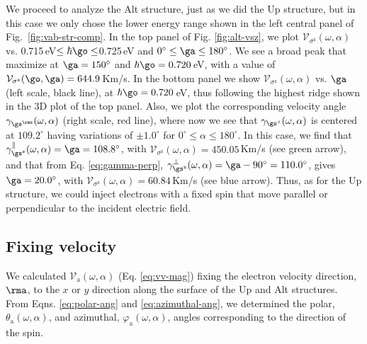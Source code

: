 \documentclass[floatfix,prb,aps,superscriptaddress,showpacs,11pt,preprint,letterpaper]{revtex4}
\begin{document}
We proceed to analyze the Alt structure, just as we did the Up structure, but
in this case we only chose the lower energy range shown in the left central
panel of Fig.~\ref{fig:vab-str-comp}. 
% 
In the top panel of Fig. \ref{fig:alt-vsz}, we plot
$\mathcal{V}_{\sigma^{\mathrm{z}}} (\omega,\alpha)$ vs.
0.715\,eV$\leq\hbar\go\leq$0.725\,eV and $0^\circ\leq\ga\leq 180^\circ$. We
see a broad peak that maximize at $\ga=150^{\circ}$ and $\hbar\go=
0.720$\,eV, with a value of $\mathcal{V}_{\sigma^{\mathrm{z}}}(\go,\ga) =
644.9$\,Km/s.
% 
In the bottom panel we  show $\mathcal{V}_{\sigma^{\mathrm{z}}}
(\omega,\alpha)$ vs. $\ga$ (left scale, black line), at $\hbar\go= 0.720$\,eV,
 thus following the highest ridge shown in the 3D plot of the top
panel. Also, we plot the corresponding velocity angle $\gamma_{\gs^\rmz}
(\omega,\alpha)$ (right scale, red line), where now we see that
$\gamma_{\gs^z}(\omega,\alpha)$ is centered at $109.2^{\circ}$ having
variations of $\pm 1.0^{\circ}$ for $0^{\circ} \leq
\alpha \leq 180^{\circ}$.
% 
In this case, we find that $\gamma^\parallel_{\gs^\mathrm{z}} (\omega,\alpha) =
\ga = 108.8^\circ$, with $\mathcal{V}_{\sigma^{\mathrm{z}}} (\omega,\alpha) =
450.05$\,Km/s (see green arrow), and that from Eq. \eqref{eq:gamma-perp},
$\gamma^\perp_{\gs^\mathrm{z}}(\omega,\alpha)=\ga-90^\circ=110.0^\circ$,
gives $\ga=20.0^\circ$, with $\mathcal{V}_{\sigma^{\mathrm{z}}}
(\omega,\alpha) = 60.84$\,Km/s (see blue arrow). Thus, as for the Up structure,
we could inject electrons with a fixed spin that move parallel or perpendicular
to the incident electric field.


\subsection{Fixing velocity} 
\label{sec:res-fixvel}

We calculated $\mathcal{V}_{\mathrm{a}}(\omega,\alpha)$ (Eq. \eqref{eq:vv-mag})
fixing the electron velocity direction, $\rma$, to the $x$ or $y$ direction
along the surface of the Up and Alt structures. From Eqns. \eqref{eq:polar-ang}
and \eqref{eq:azimuthal-ang}, we determined the polar, $\theta_{\mathrm{a}}
(\omega,\alpha)$, and azimuthal, $\varphi_{\mathrm{a}} (\omega,\alpha)$, angles
corresponding to the direction of the spin.
\end{document}

